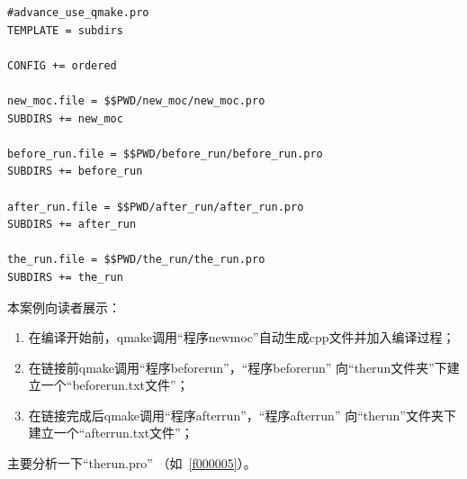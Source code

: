 \begin{lstlisting}[label=f000004,
caption=GoodLuck,
title=\lstlistingname\ \thelstlisting
]
#advance_use_qmake.pro
TEMPLATE = subdirs

CONFIG += ordered

new_moc.file = $$PWD/new_moc/new_moc.pro
SUBDIRS += new_moc

before_run.file = $$PWD/before_run/before_run.pro
SUBDIRS += before_run

after_run.file = $$PWD/after_run/after_run.pro
SUBDIRS += after_run

the_run.file = $$PWD/the_run/the_run.pro
SUBDIRS += the_run
\end{lstlisting}          %

本案例向读者展示：
\begin{enumerate}
\item 在编译开始前，qmake调用“程序new\underline{\hspace{0.5em}}moc”自动生成cpp文件并加入编译过程；
\item 在链接前qmake调用“程序before\underline{\hspace{0.5em}}run”，“程序before\underline{\hspace{0.5em}}run”
向“the\underline{\hspace{0.5em}}run文件夹”下建立一个“before\underline{\hspace{0.5em}}run.txt文件”；
\item 在链接完成后qmake调用“程序after\underline{\hspace{0.5em}}run”，“程序after\underline{\hspace{0.5em}}run”
向“the\underline{\hspace{0.5em}}run”文件夹下建立一个“after\underline{\hspace{0.5em}}run.txt文件”；
\end{enumerate}

主要分析一下“the\underline{\hspace{0.5em}}run.pro”
（如\lstlistingname\ \ref{f000005}）。


